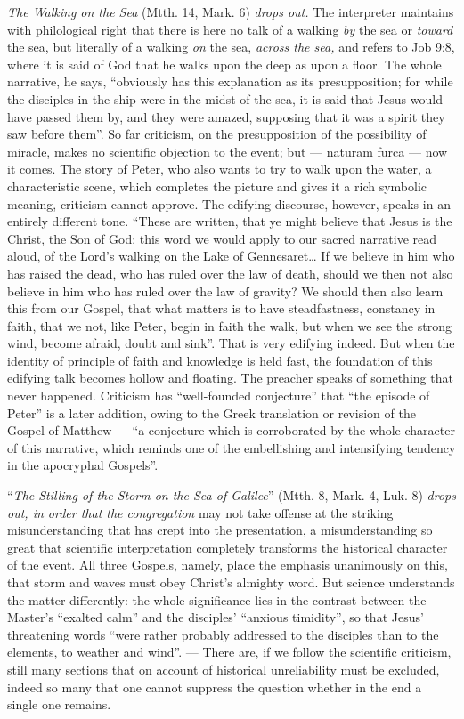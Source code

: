 \documentclass[12pt,a4paper,openany]{book}
\newcommand{\opage}[1]{\marginnote{\footnotesize\textit{[#1]}}}
\begin{document}
\emph{The Walking on the Sea} (Mtth. 14, Mark. 6)
\emph{drops out.} The interpreter maintains with philological right
that there is here no talk of a walking \emph{by} the sea or
\emph{toward} the sea, but literally of a walking \emph{on} the sea,
\emph{across the sea,} and refers to Job 9:8, where it is
said of God that he walks upon the deep as upon a
floor. The whole narrative, he says, ``obviously
has this explanation as its presupposition; for while the disciples
in the ship were in the midst of the sea, it is said that
Jesus would have passed them by, and they were amazed, supposing
that it was a spirit they saw before them''. So far
criticism, on the presupposition of the possibility of miracle,
makes no scientific objection to the event;
but --- naturam furca --- now it comes. The story
of Peter, who also wants to try to walk upon
\setcounter{footnote}{0}%
\opage{302}the water, a characteristic scene, which completes the picture
and gives it a rich symbolic meaning, criticism cannot
approve. The edifying discourse, however, speaks
in an entirely different tone. ``These are written, that
ye might believe that Jesus is the Christ, the Son of God;
this word we would apply to our sacred narrative
read aloud, of the Lord's walking on the Lake of Gennesaret\dots{}
If we believe in him who has raised the dead, who has ruled
over the law of death, should we then not also believe in
him who has ruled over the law of gravity? We should
then also learn this from our Gospel, that what
matters is to have steadfastness, constancy
in faith, that we not, like Peter, begin in faith
the walk, but when we see the strong wind,
become afraid, doubt and sink''. That is very edifying indeed.
But when the identity of principle of faith and knowledge
is held fast, the foundation of this edifying talk becomes
hollow and floating. The preacher speaks of something that never
happened. Criticism has ``well-founded conjecture''
that ``the episode of Peter'' is a later addition, owing
to the Greek translation or revision of
the Gospel of Matthew --- ``a conjecture which is corroborated
by the whole character of this narrative, which reminds
one of the embellishing and intensifying tendency in the apocryphal
Gospels''.

``\emph{The Stilling of the Storm on the Sea of Galilee}''
(Mtth. 8, Mark. 4, Luk. 8) \emph{drops out, in order that the congregation}
may not take offense at the striking misunderstanding
that has crept into the presentation, a
misunderstanding so great that scientific
interpretation completely transforms the historical
\setcounter{footnote}{0}%
\opage{303}character of the event. All three Gospels, namely, place the emphasis
unanimously on this, that storm and waves must
obey Christ's almighty word. But science understands
the matter differently: the whole significance lies in the contrast
between the Master's ``exalted calm'' and the disciples' ``anxious
timidity'', so that Jesus' threatening words ``were rather
probably addressed to the disciples than to the elements,
to weather and wind''. --- There are, if we follow the
scientific criticism, still many sections that on
account of historical unreliability must be excluded, indeed
so many that one cannot suppress the question
whether in the end a single one remains.
\end{document}
